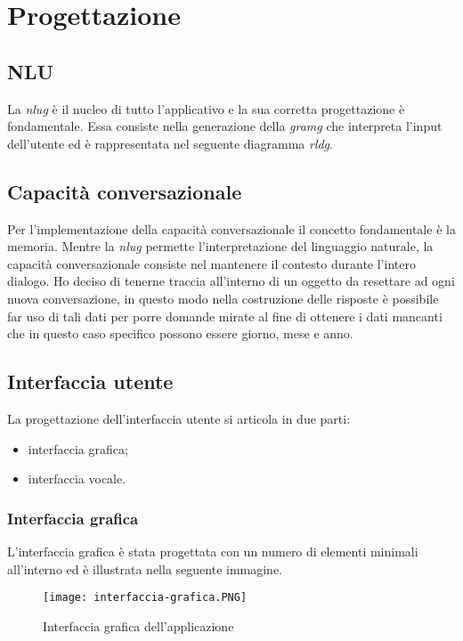 \section{Progettazione}
	\subsection{NLU}
	La \emph{\gls{nlug}} è il nucleo di tutto l'applicativo e la sua corretta progettazione è fondamentale. Essa consiste nella generazione della \emph{\gls{gramg}} che interpreta l'input dell'utente ed è rappresentata nel seguente diagramma \emph{\gls{rldg}}.
	
	
	\subsection{Capacità conversazionale}
	Per l'implementazione della capacità conversazionale il concetto fondamentale è la memoria. Mentre la \emph{\gls{nlug}} permette l'interpretazione del linguaggio naturale, la capacità conversazionale consiste nel mantenere il contesto durante l'intero dialogo. Ho deciso di tenerne traccia all'interno di un oggetto da resettare ad ogni nuova conversazione, in questo modo nella costruzione delle risposte è possibile far uso di tali dati per porre domande mirate al fine di ottenere i dati mancanti che in questo caso specifico possono essere giorno, mese e anno.
	\subsection{Interfaccia utente}
	La progettazione dell'interfaccia utente si articola in due parti:
	\begin{itemize}
		\item interfaccia grafica;
		\item interfaccia vocale.
	\end{itemize}
		\subsubsection{Interfaccia grafica}
		L'interfaccia grafica è stata progettata con un numero di elementi minimali all'interno ed è illustrata nella seguente immagine.
		
		\begin{figure}[htbp]
			\begin{center}
				\texttt{[image: interfaccia-grafica.PNG]}
				\caption{Interfaccia grafica dell'applicazione}
			\end{center}
		\end{figure}
	
